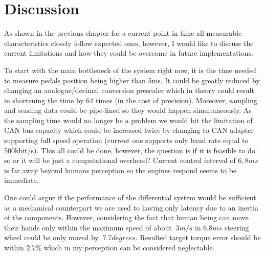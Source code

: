 



\chapter{Discussion}
As shown in the previous chapter for a current point in time all measurable characteristics closely follow expected ones, however, I would like to discuss the current limitations and how they could be overcome in future implementations.

To start with the main bottleneck of the system right now, it is the time needed to measure pedals position being higher than 5ms. It could be greatly reduced by changing an analogue/decimal conversion prescaler which in theory could result in shortening the time by 64 times (in the cost of precision). Moreover, sampling and sending data could be pipe-lined so they would happen simultaneously. As the sampling time would no longer be a problem we would hit the limitation of CAN bus capacity which could be increased twice by changing to CAN adapter supporting full speed operation (current one supports only baud rate equal to 500kbit/s). This all could be done, however, the question is if it is feasible to do so or it will be just a computational overhead? Current control interval of $6,8ms$ is far away beyond humans perception so the engines respond seems to be immediate. 

One could argue if the performance of the differential system would be sufficient as a mechanical counterpart we are used to having only latency due to an inertia of the components. However, considering the fact that human being can move their hands only within the maximum speed of about $~3m/s$ \cite{human_reaction_time} in $6.8ms$ steering wheel could be only moved by $~7.7 degrees$. Resulted target torque error should be within $2.7\%$ which in my perception can be considered neglectable.

